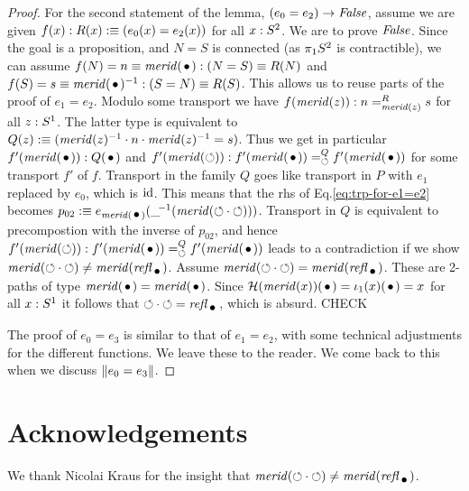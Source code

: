 \documentclass[english,a4]{article}
\begin{document}
\begin{proof}
For the second statement of the lemma, $(e_0 = e_2)\to\mathop{\mathit{False}}$,
assume we are given $f(x):R(x)\mathrel{\hbox{:}\mkern-5mu\equiv}(e_0(x)=e_2(x))$ for all $x:S^2$.
We are to prove $\mathop{\mathit{False}}$. Since the goal is a proposition,
and $N=S$ is connected (as $\pi_1 S^2$ is contractible),
we can assume $f(N)=n\jdeq\mrd(\base):(N=S)\jdeq R(N)$ and 
$f(S)=s\jdeq\mrd(\base)^{-1}:(S=N)\jdeq R(S)$.
This allows us to reuse parts of the proof of $e_1 = e_2$.
Modulo some transport we have $f(\mathit{merid}(z)): n=^R_{\mathit{merid}(z)}s$
for all $z:{S^1}$. The latter type is equivalent to
$Q(z)\mathrel{\hbox{:}\mkern-5mu\equiv}(\mathit{merid}(z)^{-1}\cdot n\cdot \mathit{merid}(z)^{-1} = s)$.
Thus we get in particular $f'(\mrd(\base)): Q(\base)$ and 
$f'(\mrd(\Sloop)): f'(\mrd(\base))=^Q_{\Sloop}f'(\mrd(\base))$
for some transport $f'$ of $f$.
Transport in the family $Q$ goes like transport in $P$ with $e_1$
replaced by $e_0$, which is $\mathord{\mathrm{id}}$. 
This means that the rhs of Eq.\ref{eq:trp-for-e1=e2} becomes
$p_{02}\defeq e_{\mrd(\base)}(\_\!^{-1}(\mrd(\Sloop\cdot\Sloop)))$.
Transport in $Q$ is equivalent to precompostion with the inverse of $p_{02}$,
and hence $f'(\mrd(\Sloop)): f'(\mrd(\base))=^Q_{\Sloop}f'(\mrd(\base))$
leads to a contradiction if we show
$\mrd(\Sloop\cdot\Sloop) \neq \mrd(\refl{\base})$.
Assume $\mrd(\Sloop\cdot\Sloop) = \mrd(\refl{\base})$.
These are 2-paths of type $\mrd(\base)=\mrd(\base)$.
Since $\hopffam(\mrd(x))(\base) = \iota_1(x)(\base) = x$ for all $x:{S^1}$
it follows that $\Sloop\cdot\Sloop = \refl{\base}$, which is absurd. CHECK

The proof of $e_0 = e_3$ is similar to that of $e_1 = e_2$, with some
technical adjustments for the different functions. We leave these to the
reader. We come back to this when we discuss $\lVert e_0 = e_3\rVert$.
\end{proof}

\section*{Acknowledgements}
We thank Nicolai Kraus for the insight that
$\mrd(\Sloop\cdot\Sloop) \neq \mrd(\refl{\base})$.
\end{document}

